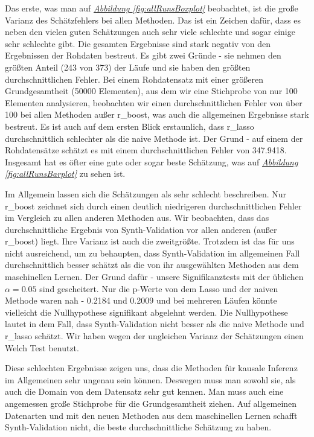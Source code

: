 \documentclass[12pt,a4paper,twoside]{scrartcl}
\numberwithin{equation}{section}
\newcommand{\reffig}[1]{\emph{\hyperref[#1]{Abbildung \ref*{#1}}}}
\begin{document}
\noindent
Das erste, was man auf \reffig{fig:allRunsBoxplot} beobachtet, ist die große Varianz des Schätzfehlers bei allen Methoden. Das ist ein Zeichen dafür, dass es neben den vielen guten Schätzungen auch sehr viele schlechte und sogar einige sehr schlechte gibt. Die gesamten Ergebnisse sind stark negativ von den Ergebnissen der Rohdaten bestreut. Es gibt zwei Gründe - sie nehmen den größten Anteil (243 von 373) der Läufe und sie haben den größten durchschnittlichen Fehler. Bei einem Rohdatensatz mit einer größeren Grundgesamtheit (50000 Elementen), aus dem wir eine Stichprobe von nur 100 Elementen analysieren, beobachten wir einen durchschnittlichen Fehler von über 100 bei allen Methoden außer r\_boost, was auch die allgemeinen Ergebnisse stark bestreut. Es ist auch auf dem ersten Blick erstaunlich, dass r\_lasso durchschnittlich schlechter als die naive Methode ist. Der Grund - auf einem der Rohdatensätze schätzt es mit einem durchschnittlichen Fehler von 347.9418. Insgesamt hat es öfter eine gute oder sogar beste Schätzung, was auf \reffig{fig:allRunsBarplot} zu sehen ist.\par 

\noindent
Im Allgemein lassen sich die Schätzungen als sehr schlecht beschreiben. Nur r\_boost zeichnet sich durch einen deutlich niedrigeren durchschnittlichen Fehler im Vergleich zu allen anderen Methoden aus. Wir beobachten, dass das durchschnittliche Ergebnis von Synth-Validation vor allen anderen (außer r\_boost) liegt. Ihre Varianz ist auch die zweitgrößte. Trotzdem ist das für uns nicht ausreichend, um zu behaupten, dass Synth-Validation im allgemeinen Fall durchschnittlich besser schätzt als die von ihr ausgewählten Methoden aus dem maschinellen Lernen. Der Grund dafür - unsere Signifikanztests mit der üblichen $\alpha = 0.05$ sind gescheitert. Nur die p-Werte von dem Lasso und der naiven Methode waren nah -  0.2184 und 0.2009 und bei mehreren Läufen könnte vielleicht die Nullhypothese signifikant abgelehnt werden. Die Nullhypothese lautet in dem Fall, dass Synth-Validation nicht besser als die naive Methode und r\_lasso schätzt. Wir haben wegen der ungleichen Varianz der Schätzungen einen Welch Test benutzt.\par 

\noindent
Diese schlechten Ergebnisse zeigen uns, dass die Methoden für kausale Inferenz im Allgemeinen sehr ungenau sein können. Deswegen muss man sowohl sie, als auch die Domain von dem Datensatz sehr gut kennen. Man muss auch eine angemessen große Stichprobe für die Grundgesamtheit ziehen. Auf allgemeinen Datenarten und mit den neuen Methoden aus dem maschinellen Lernen schafft Synth-Validation nicht, die beste durchschnittliche Schätzung zu haben.\par 
\end{document}
